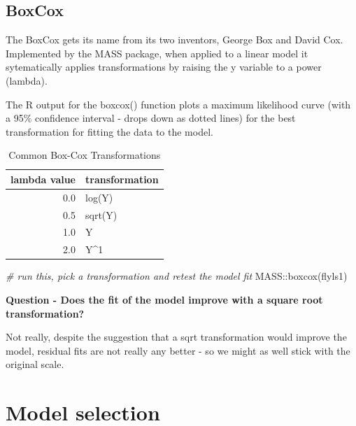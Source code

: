 \documentclass[
]{book}
\makeatletter
\newenvironment{Shaded}{\begin{snugshade}}{\end{snugshade}}
\newcommand{\CommentTok}[1]{\textcolor[rgb]{0.56,0.35,0.01}{\textit{#1}}}
\newcommand{\FunctionTok}[1]{\textcolor[rgb]{0.00,0.00,0.00}{#1}}
\newcommand{\NormalTok}[1]{#1}
\newcommand{\SpecialCharTok}[1]{\textcolor[rgb]{0.00,0.00,0.00}{#1}}
\newenvironment{kframe}{%
\medskip{}
\setlength{\fboxsep}{.8em}
 \def\at@end@of@kframe{}%
 \ifinner\ifhmode%
  \def\at@end@of@kframe{\end{minipage}}%
  \begin{minipage}{\columnwidth}%
 \fi\fi%
 \def\FrameCommand##1{\hskip\@totalleftmargin \hskip-\fboxsep
 \colorbox{shadecolor}{##1}\hskip-\fboxsep
     \hskip-\linewidth \hskip-\@totalleftmargin \hskip\columnwidth}%
 \MakeFramed {\advance\hsize-\width
   \@totalleftmargin\z@ \linewidth\hsize
   \@setminipage}}%
 {\par\unskip\endMakeFramed%
 \at@end@of@kframe}
\newenvironment{block}[1]
  {
  \begin{itemize}
  \renewcommand{\labelitemi}{
    \raisebox{-.7\height}[0pt][0pt]{
      {\setkeys{Gin}{width=3em,keepaspectratio}\texttt{[image: images/\#1]}}
    }
  }
  \setlength{\fboxsep}{1em}
  \begin{kframe}
  \item
  }
  {
  \end{kframe}
  \end{itemize}
  }
\newenvironment{rmdnote}
  {\begin{block}{note}}
  {\end{block}}
\makeatother
\begin{document}
\hypertarget{boxcox}{%
\subsection{BoxCox}\label{boxcox}}

\begin{rmdnote}
The BoxCox gets its name from its two inventors, George Box and David
Cox. Implemented by the MASS package, when applied to a linear model it
sytematically applies transformations by raising the y variable to a
power (lambda).

The R output for the boxcox() function plots a maximum likelihood curve
(with a 95\% confidence interval - drops down as dotted lines) for the
best transformation for fitting the data to the model.
\end{rmdnote}

\begin{table}

\caption{\label{tab:unnamed-chunk-521}Common Box-Cox Transformations}
\centering
\fontsize{16}{18}\selectfont
\begin{tabular}[t]{rl}
\toprule
lambda value & transformation\\
\midrule
0.0 & log(Y)\\
0.5 & sqrt(Y)\\
1.0 & Y\\
2.0 & Y\textasciicircum{}1\\
\bottomrule
\end{tabular}
\end{table}

\begin{Shaded}
\begin{Highlighting}[]
\CommentTok{\# run this, pick a transformation and retest the model fit}
\NormalTok{MASS}\SpecialCharTok{::}\FunctionTok{boxcox}\NormalTok{(flyls1)}
\end{Highlighting}
\end{Shaded}

\textbf{Question - Does the fit of the model improve with a square root transformation?}

Not really, despite the suggestion that a sqrt transformation would improve the model, residual fits are not really any better - so we might as well stick with the original scale.

\hypertarget{model-selection}{%
\section{Model selection}\label{model-selection}}
\end{document}

